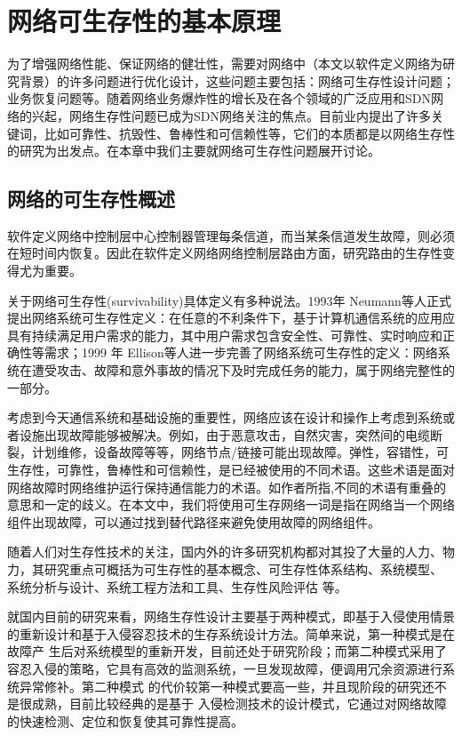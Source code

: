 
\chapter{网络可生存性的基本原理}
为了增强网络性能、保证网络的健壮性，需要对网络中（本文以软件定义网络为研究背景）的许多问题进行优化设计，这些问题主要包括：网络可生存性设计问题；业务恢复问题等。随着网络业务爆炸性的增长及在各个领域的广泛应用和SDN网络的兴起，网络生存性问题已成为SDN网络关注的焦点。目前业内提出了许多关键词，比如可靠性、抗毁性、鲁棒性和可信赖性等，它们的本质都是以网络生存性的研究为出发点。在本章中我们主要就网络可生存性问题展开讨论。



\section{网络的可生存性概述}
软件定义网络中控制层中心控制器管理每条信道，而当某条信道发生故障，则必须在短时间内恢复。因此在软件定义网络网络控制层路由方面，研究路由的生存性变得尤为重要。

关于网络可生存性(survivability)具体定义有多种说法\cite{al2009comparative}。1993年 Neumann\cite{hollway1993survivable}等人正式提出网络系统可生存性定义：在任意的不利条件下，基于计算机通信系统的应用应具有持续满足用户需求的能力，其中用户需求包含安全性、可靠性、实时响应和正确性等需求；1999 年 Ellison\cite{ellison1997survivable}等人进一步完善了网络系统可生存性的定义：网络系统在遭受攻击、故障和意外事故的情况下及时完成任务的能力，属于网络完整性的一部分。

考虑到今天通信系统和基础设施的重要性，网络应该在设计和操作上考虑到系统或者设施出现故障能够被解决。例如，由于恶意攻击，自然灾害，突然间的电缆断裂，计划维修，设备故障等等，网络节点/链接可能出现故障。弹性，容错性，可生存性，可靠性，鲁棒性和可信赖性，是已经被使用的不同术语。这些术语是面对网络故障时网络维护运行保持通信能力的术语。如作者\cite{al2009comparative}所指,不同的术语有重叠的意思和一定的歧义。在本文中，我们将使用可生存网络一词是指在网络当一个网络组件出现故障，可以通过找到替代路径来避免使用故障的网络组件。

随着人们对生存性技术的关注，国内外的许多研究机构都对其投了大量的人力、物 力，其研究重点可概括为可生存性的基本概念\cite{kuipers2012overview}、可生存性体系结构、系统模型\cite{luxinhua2006}、 系统分析与设计、系统工程方法和工具、生存性风险评估\cite{linxuegang2006} 等。

就国内目前的研究来看，网络生存性设计主要基于两种模式\cite{hanjianjun2007}，即基于入侵使用情景 的重新设计和基于入侵容忍技术的生存系统设计方法。简单来说，第一种模式是在故障产 生后对系统模型的重新开发，目前还处于研究阶段；而第二种模式采用了容忍入侵的策略，它具有高效的监测系统，一旦发现故障，便调用冗余资源进行系统异常修补。第二种模式 的代价较第一种模式要高一些，并且现阶段的研究还不是很成熟，目前比较经典的是基于 入侵检测技术的设计模式，它通过对网络故障的快速检测、定位和恢复使其可靠性提高。

